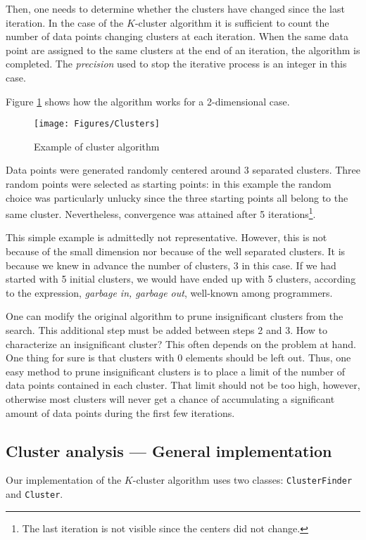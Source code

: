 {Then, one needs to determine whether the clusters have changed
since the last iteration. In the case of the $K$-cluster algorithm
it is sufficient to count the number of data points changing
clusters at each iteration. When the same data point are assigned
to the same clusters at the end of an iteration, the algorithm is
completed. The \textsl{precision} used to stop the iterative process
is an integer in this case.

Figure \ref{fig:clustersteps} shows how the algorithm works for a
2-dimensional case.
\begin{figure}
\centering\texttt{[image: Figures/Clusters]}
\caption{Example of cluster algorithm}\label{fig:clustersteps}
\end{figure}
Data points were generated randomly centered around 3 separated
clusters. Three random points were selected as starting points: in
this example the random choice was particularly unlucky since the
three starting points all belong to the same cluster.
Nevertheless, convergence was attained after 5
iterations\footnote{The last iteration is not visible since the
centers did not change.}.

 This simple example is admittedly not
representative. However, this is not because of the small
dimension nor because of the well separated clusters. It is
because we knew in advance the number of clusters, 3 in this case.
If we had started with 5 initial clusters, we would have ended up
with 5 clusters, according to the expression, \textsl{garbage in,
garbage out}, well-known among programmers.

One can modify the original algorithm to prune insignificant
clusters from the search. This additional step must be added
between steps 2 and 3. How to characterize an insignificant
cluster? This often depends on the problem at hand. One thing for
sure is that clusters with 0 elements should be left out. Thus,
one easy method to prune insignificant clusters is to place a
limit of the number of data points contained in each cluster. That
limit should not be too high, however, otherwise most clusters
will never get a chance of accumulating a significant amount of
data points during the first few iterations.

\subsection{Cluster analysis --- General implementation}
 Our implementation of
the $K$-cluster algorithm uses two classes: \texttt{ClusterFinder}
and \texttt{Cluster}.

}
